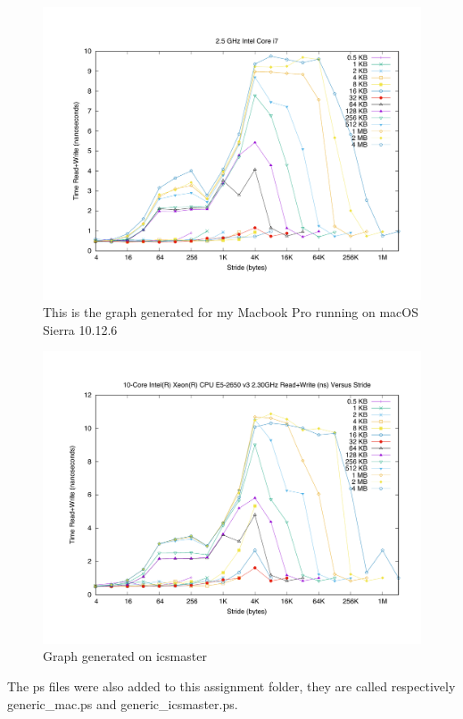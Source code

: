 \documentclass[unicode,11pt,a4paper,oneside,numbers=endperiod,openany]{scrartcl}
\begin{document}
\begin{enumerate}
        \begin{figure}[H]
            \includegraphics[width=\linewidth]{./membench/generic_mac.pdf}
            \caption{This is the graph generated for my Macbook Pro running on macOS Sierra 10.12.6}
        \end{figure}
        \begin{figure}[H]
            \includegraphics[width=\linewidth]{./membench/generic_icsmaster.pdf}
            \caption{Graph generated on icsmaster}
        \end{figure}
           
        The ps files were also added to this assignment folder, they are called respectively generic\_mac.ps and generic\_icsmaster.ps.



\end{enumerate}
\end{document}
